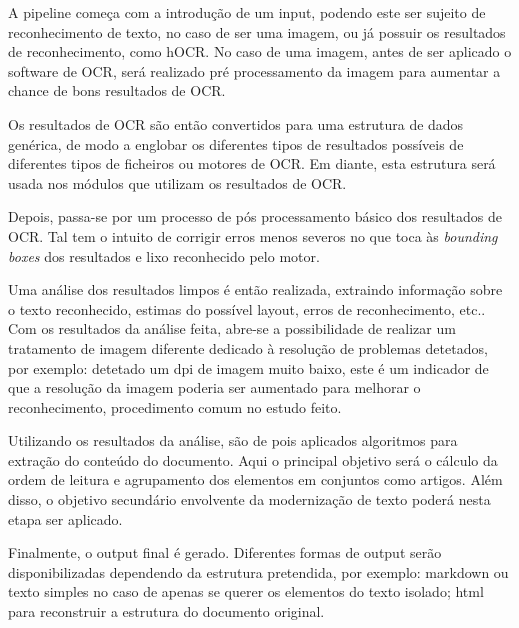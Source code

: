 A pipeline começa com a introdução de um input, podendo este ser sujeito de reconhecimento de texto, no caso de ser uma imagem, ou já possuir os resultados de reconhecimento, como hOCR. No caso de uma imagem, antes de ser aplicado o software de OCR, será realizado pré processamento da imagem para aumentar a chance de bons resultados de OCR.

Os resultados de OCR são então convertidos para uma estrutura de dados genérica, de modo a englobar os diferentes tipos de resultados possíveis de diferentes tipos de ficheiros ou motores de OCR. Em diante, esta estrutura será usada nos módulos que utilizam os resultados de OCR.

Depois, passa-se por um processo de pós processamento básico dos resultados de OCR. Tal tem o intuito de corrigir erros menos severos no que toca às \textit{bounding boxes} dos resultados e lixo reconhecido pelo motor.

Uma análise dos resultados limpos é então realizada, extraindo informação sobre o texto reconhecido, estimas do possível layout, erros de reconhecimento, etc.. Com os resultados da análise feita, abre-se a possibilidade de realizar um tratamento de imagem diferente dedicado à resolução de problemas detetados, por exemplo: detetado um \acrshort{dpi} de imagem muito baixo, este é um indicador de que a resolução da imagem poderia ser aumentado para melhorar o reconhecimento, procedimento comum no estudo feito.

Utilizando os resultados da análise, são de pois aplicados algoritmos para extração do conteúdo do documento. Aqui o principal objetivo será o cálculo da ordem de leitura e agrupamento dos elementos em conjuntos como artigos.
Além disso, o objetivo secundário envolvente da modernização de texto poderá nesta etapa ser aplicado.

Finalmente, o output final é gerado. Diferentes formas de output serão disponibilizadas dependendo da estrutura pretendida, por exemplo: markdown ou texto simples no caso de apenas se querer os elementos do texto isolado; html para reconstruir a estrutura do documento original. 

